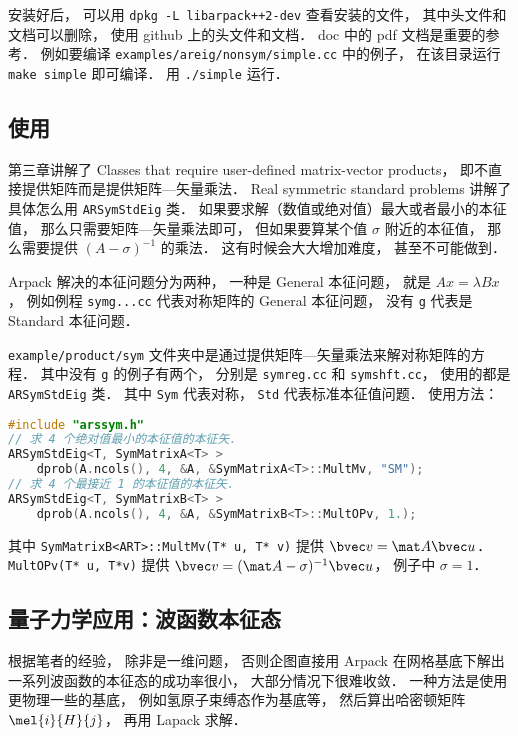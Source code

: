 安装好后， 可以用 \verb|dpkg -L libarpack++2-dev| 查看安装的文件， 其中头文件和文档可以删除， 使用 github 上的头文件和文档． doc 中的 pdf 文档是重要的参考． 例如要编译 \verb|examples/areig/nonsym/simple.cc| 中的例子， 在该目录运行 \verb|make simple| 即可编译． 用 \verb|./simple| 运行．

\subsection{使用}
第三章讲解了 Classes that require user-defined matrix-vector products， 即不直接提供矩阵而是提供矩阵—矢量乘法． Real symmetric standard problems 讲解了具体怎么用 \verb|ARSymStdEig| 类． 如果要求解（数值或绝对值）最大或者最小的本征值， 那么只需要矩阵—矢量乘法即可， 但如果要算某个值 $\sigma$ 附近的本征值， 那么需要提供 $(A - \sigma)^{-1}$ 的乘法． 这有时候会大大增加难度， 甚至不可能做到．

Arpack 解决的本征问题分为两种， 一种是 General 本征问题， 就是 $Ax = \lambda Bx$， 例如例程 \verb|symg...cc| 代表对称矩阵的 General 本征问题， 没有 \verb|g| 代表是 Standard 本征问题．

\verb|example/product/sym| 文件夹中是通过提供矩阵—矢量乘法来解对称矩阵的方程． 其中没有 \verb|g| 的例子有两个， 分别是 \verb|symreg.cc| 和 \verb|symshft.cc|， 使用的都是 \verb|ARSymStdEig| 类． 其中 \verb|Sym| 代表对称， \verb|Std| 代表标准本征值问题． 使用方法：
\begin{lstlisting}[language=cpp]
#include "arssym.h"
// 求 4 个绝对值最小的本征值的本征矢．
ARSymStdEig<T, SymMatrixA<T> >
    dprob(A.ncols(), 4, &A, &SymMatrixA<T>::MultMv, "SM");
// 求 4 个最接近 1 的本征值的本征矢．
ARSymStdEig<T, SymMatrixB<T> >
    dprob(A.ncols(), 4, &A, &SymMatrixB<T>::MultOPv, 1.);
\end{lstlisting}
其中 \verb|SymMatrixB<ART>::MultMv(T* u, T* v)| 提供 $\bvec v = \mat A\bvec u$． \verb|MultOPv(T* u, T*v)| 提供 $\bvec v = (\mat A - \sigma)^{-1}\bvec u$， 例子中 $\sigma = 1$．

\subsection{量子力学应用：波函数本征态}
根据笔者的经验， 除非是一维问题， 否则企图直接用 Arpack 在网格基底下解出一系列波函数的本征态的成功率很小， 大部分情况下很难收敛． 一种方法是使用更物理一些的基底， 例如氢原子束缚态作为基底等， 然后算出哈密顿矩阵 $\mel{i}{H}{j}$， 再用 Lapack 求解．
